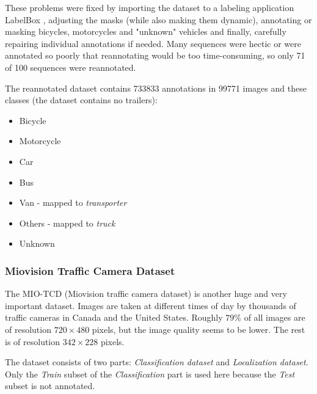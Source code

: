 These problems were fixed by importing the dataset to a labeling application
LabelBox \cite{labelbox}, adjusting the masks (while also making them dynamic),
annotating or masking bicycles, motorcycles and "unknown" vehicles and finally,
carefully repairing individual annotations if needed. Many sequences were hectic
or were annotated so poorly that reannotating would be too time-consuming, so
only 71 of 100 sequences were reannotated.

The reannotated dataset contains \num{733833} annotations in \num{99771}
images and these classes (the dataset contains no trailers):
\begin{itemize}
    \item Bicycle
    \item Motorcycle
    \item Car
    \item Bus
    \item Van - mapped to \textit{transporter}
    \item Others - mapped to \textit{truck}
    \item Unknown
\end{itemize}


\subsubsection*{Miovision Traffic Camera Dataset}

The MIO-TCD (Miovision traffic camera dataset) \cite{MIO2018} is another huge
and very important dataset. Images are taken at different times of day by
thousands of traffic cameras in Canada and the United States. Roughly $79\%$ of
all images are of resolution $720 \times 480$ pixels, but the image quality
seems to be lower. The rest is of resolution $342 \times 228$ pixels. 

The dataset consists of two parts: \textit{Classification dataset} and
\textit{Localization dataset}. Only the \textit{Train} subset of the
\textit{Classification} part is used here because the \textit{Test} subset is
not annotated.

